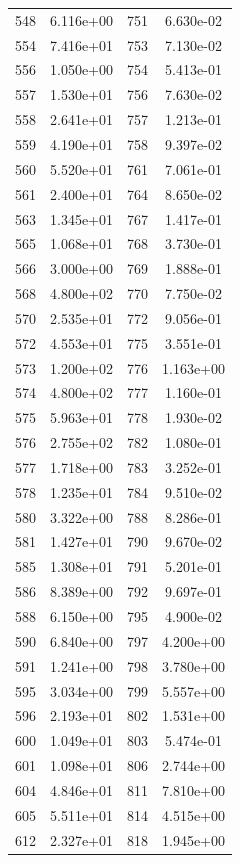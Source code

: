 \documentclass[12pt]{article}
\begin{document}
\begin{longtable}{@{}cccc@{}}
548 & 6.116e+00 & 751 & 6.630e-02 \\
554 & 7.416e+01 & 753 & 7.130e-02 \\
556 & 1.050e+00 & 754 & 5.413e-01 \\
557 & 1.530e+01 & 756 & 7.630e-02 \\
558 & 2.641e+01 & 757 & 1.213e-01 \\
559 & 4.190e+01 & 758 & 9.397e-02 \\
560 & 5.520e+01 & 761 & 7.061e-01 \\
561 & 2.400e+01 & 764 & 8.650e-02 \\
563 & 1.345e+01 & 767 & 1.417e-01 \\
565 & 1.068e+01 & 768 & 3.730e-01 \\
566 & 3.000e+00 & 769 & 1.888e-01 \\
568 & 4.800e+02 & 770 & 7.750e-02 \\
570 & 2.535e+01 & 772 & 9.056e-01 \\
572 & 4.553e+01 & 775 & 3.551e-01 \\
573 & 1.200e+02 & 776 & 1.163e+00 \\
574 & 4.800e+02 & 777 & 1.160e-01 \\
575 & 5.963e+01 & 778 & 1.930e-02 \\
576 & 2.755e+02 & 782 & 1.080e-01 \\
577 & 1.718e+00 & 783 & 3.252e-01 \\
578 & 1.235e+01 & 784 & 9.510e-02 \\
580 & 3.322e+00 & 788 & 8.286e-01 \\
581 & 1.427e+01 & 790 & 9.670e-02 \\
585 & 1.308e+01 & 791 & 5.201e-01 \\
586 & 8.389e+00 & 792 & 9.697e-01 \\
588 & 6.150e+00 & 795 & 4.900e-02 \\
590 & 6.840e+00 & 797 & 4.200e+00 \\
591 & 1.241e+00 & 798 & 3.780e+00 \\
595 & 3.034e+00 & 799 & 5.557e+00 \\
596 & 2.193e+01 & 802 & 1.531e+00 \\
600 & 1.049e+01 & 803 & 5.474e-01 \\
601 & 1.098e+01 & 806 & 2.744e+00 \\
604 & 4.846e+01 & 811 & 7.810e+00 \\
605 & 5.511e+01 & 814 & 4.515e+00 \\
612 & 2.327e+01 & 818 & 1.945e+00 \\

\end{longtable}
\end{document}
